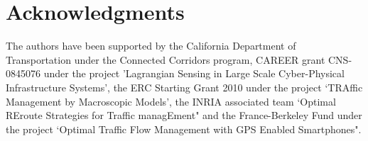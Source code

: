 \section{Acknowledgments}\label{sec:ack}

The authors have been supported by the California Department of Transportation
under the Connected Corridors program, CAREER grant CNS-0845076 under the
project 'Lagrangian Sensing in Large Scale Cyber-Physical Infrastructure
Systems', the ERC Starting Grant 2010 under the project `TRAffic Management by
Macroscopic Models', the INRIA associated team `Optimal REroute Strategies for
Traffic managEment" and the France-Berkeley Fund under the project `Optimal
Traffic Flow Management with GPS Enabled Smartphones".
